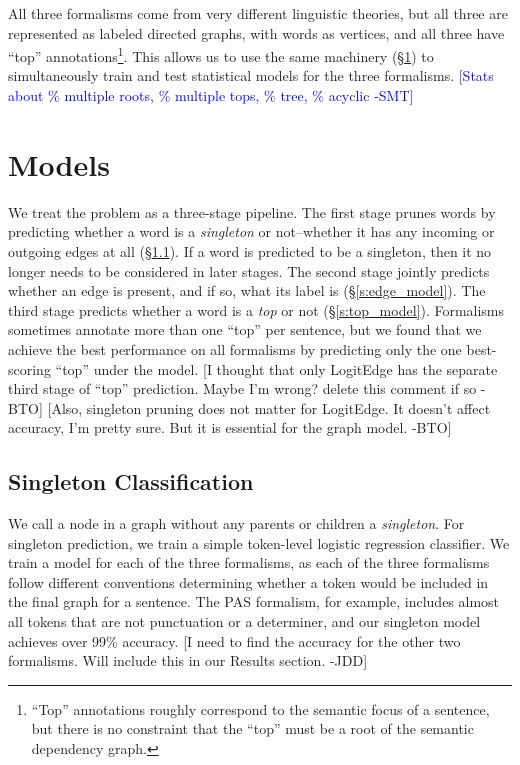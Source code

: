 \documentclass[11pt]{article}
\newcommand{\bocomment}[1]{\textcolor{Bittersweet}{[#1 -BTO]}}
\newcommand{\sam}[1]{\textcolor{blue}{[#1 -SMT]}}
\newcommand{\jdcomment}[1]{\textcolor{NavyBlue}{[#1 -JDD]}}
\begin{document}
All three formalisms come from very different linguistic theories, but all
three are represented as labeled directed graphs, with words as vertices, and
all three have ``top'' annotations\footnote{
``Top'' annotations roughly correspond to the semantic focus of a
sentence, but there is no constraint that the ``top'' must be a root of the
semantic dependency graph.}.
This allows us to use the same machinery (\S\ref{s:models}) to simultaneously
train and test statistical models for the three formalisms.
\sam{Stats about \% multiple roots, \% multiple tops, \% tree, \% acyclic}



\section{Models} \label{s:models}

We treat the problem as a three-stage pipeline.
The first stage prunes words by predicting whether a word is a \emph{singleton}
or not--whether it has any incoming or outgoing edges at all (\S\ref{s:singleton_model}).
If a word is predicted to be a singleton, then it no longer needs to be
considered in later stages.
The second stage jointly predicts whether an edge is
present, and if so, what its label is (\S\ref{s:edge_model}).
The third stage predicts whether a word is a \emph{top} or not
(\S\ref{s:top_model}).
Formalisms sometimes annotate more than one ``top'' per sentence, but we
found that we achieve the best performance on all formalisms by predicting only
the one best-scoring ``top'' under the model.
\bocomment{I thought that only LogitEdge has the separate third stage of ``top'' prediction. Maybe I'm wrong? delete this comment if so}
\bocomment{Also, singleton pruning does not matter for LogitEdge.  It doesn't affect accuracy, I'm pretty sure.  But it is essential for the graph model.}


\subsection{Singleton Classification} \label{s:singleton_model}

We call a node in a graph without any parents or children a \emph{singleton}.
For singleton prediction, we train a simple token-level logistic regression
classifier.
We train a model for each of the three formalisms, as each of the three
formalisms follow different conventions determining whether a token would be
included in the final graph for a sentence.
The PAS formalism, for example, includes almost all tokens that are not
punctuation or a determiner, and our singleton model achieves over 99\%
accuracy.
\jdcomment{I need to find the accuracy for the other two formalisms. Will
include this in our Results section.}
\end{document}
